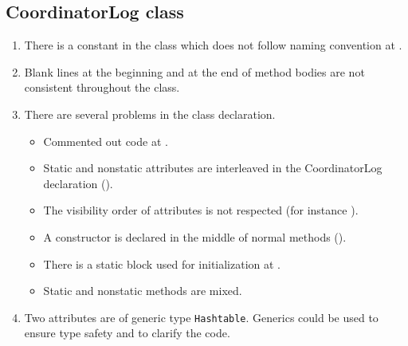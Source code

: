 \subsection{CoordinatorLog class}
\label{sec:coordinatorlog-class}
\begin{enumerate}
	\item {} There is a constant in the class which does not follow naming convention at .
    \item {} Blank lines at the beginning and at the end of method bodies are not consistent throughout the class.
    \item {} There are several problems in the class declaration.
    \begin{itemize}
        \item  Commented out code at .
        \item Static and nonstatic attributes are interleaved in the CoordinatorLog declaration ().
        \item The visibility order of attributes is not respected (for instance ).
        \item A constructor is declared in the middle of normal methods ().
        \item There is a static block used for initialization at .
        \item Static and nonstatic methods are mixed.
    \end{itemize}
    \item {} Two attributes are of generic type \texttt{Hashtable}. Generics could be used to ensure type safety and to clarify the code.


\end{enumerate}
